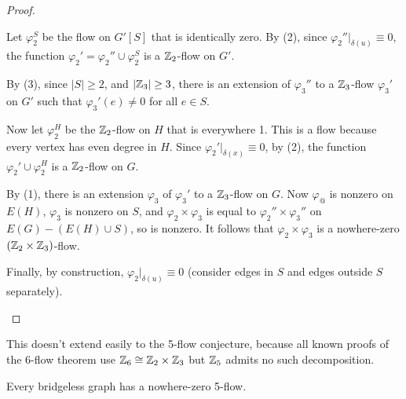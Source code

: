 \documentclass[main.tex]{subfiles}
\begin{document}
\begin{proof}
\begin{itemize}
      Let $\varphi_2^S$ be the flow on $G'[S]$ that is identically zero.
      By (2), since $\varphi_2''|_{\delta(u)}\equiv 0$, the function
      $\varphi_2' = \varphi_2''\cup\varphi_2^S$ is a $\mathbb Z_2$-flow on $G'$.

      By (3), since $|S|\geq 2$, and $|\mathbb Z_3|\geq 3$, there is an extension
      of $\varphi_3''$ to a $\mathbb Z_3$-flow $\varphi_3'$ on $G'$ such that
      $\varphi_3'(e)\neq 0$ for all $e\in S$.

      Now let $\varphi_2^H$ be the $\mathbb Z_2$-flow on $H$ that is everywhere 1.
      This is a flow because every vertex has even degree in $H$.
      Since $\varphi_2'|_{\delta(x)}\equiv 0$, by (2), the function
      $\varphi_2'\cup\varphi_2^H$ is a $\mathbb Z_2$-flow on $G$.

      By (1), there is an extension $\varphi_3$ of $\varphi_3'$ to a
      $\mathbb Z_3$-flow on $G$.
      Now $\varphi_@$ is nonzero on $E(H)$, $\varphi_3$ is nonzero on $S$,
      and $\varphi_2\times\varphi_3$ is equal to $\varphi_2''\times\varphi_3''$
      on $E(G) - (E(H)\cup S)$, so is nonzero.
      It follows that $\varphi_2\times\varphi_3$ is a nowhere-zero
      $(\mathbb Z_2\times\mathbb Z_3)$-flow.

      Finally, by construction, $\varphi_2|_{\delta(u)}\equiv 0$
      (consider edges in $S$ and edges outside $S$ separately). \qedhere
  \end{itemize}
\end{proof}
This doesn't extend easily to the 5-flow conjecture,
because all known proofs of the 6-flow theorem use $\mathbb Z_6\cong\mathbb Z_2\times\mathbb Z_3$
but $\mathbb Z_5$ admits no such decomposition.
\begin{conjecture}
  Every bridgeless graph has a nowhere-zero 5-flow.
\end{conjecture}
\end{document}
